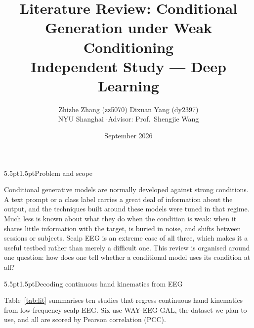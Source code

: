 \documentclass[11pt]{article}
\title{\vspace{-1.5em}\textbf{Literature Review: Conditional Generation under Weak Conditioning}\\[4pt]
\large Independent Study --- Deep Learning}
\author{Zhizhe Zhang (zz5070) \quad Dixuan Yang (dy2397)\\
NYU Shanghai \quad$\cdot$\quad Advisor: Prof.\ Shengjie Wang}
\date{September 2026}
\makeatletter
\renewcommand\section{\@startsection{section}{1}{\z@}%
  {5.5pt\@plus2pt\@minus2pt}{1.5pt}{\normalfont\large\bfseries}}
\makeatother
\begin{document}
\maketitle
\vspace{-3em}

\section{Problem and scope}

Conditional generative models are normally developed against strong conditions. A text prompt or a class label carries a great deal of information about the output, and the techniques built around these models were tuned in that regime. Much less is known about what they do when the condition is weak: when it shares little information with the target, is buried in noise, and shifts between sessions or subjects. Scalp EEG is an extreme case of all three, which makes it a useful testbed rather than merely a difficult one. This review is organised around one question: how does one tell whether a conditional model uses its condition at all?

\section{Decoding continuous hand kinematics from EEG}

Table~\ref{tab:lit} summarises ten studies that regress continuous hand kinematics from low-frequency scalp EEG. Six use WAY-EEG-GAL, the dataset we plan to use, and all are scored by Pearson correlation (PCC).
\end{document}
